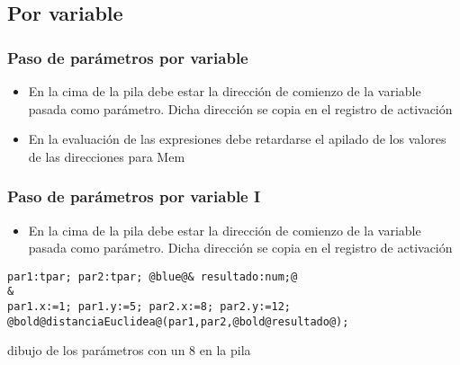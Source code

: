 \documentclass[hyperref={pdfpagelabels=false},tree-dvips,compress]{beamer}
\begin{document}
\subsection{Por variable}
\begin{frame}[fragile]
\frametitle{Paso de parámetros por variable}

\begin{itemize}[<+->]
	\item En la cima de la pila debe estar la dirección de comienzo de la variable pasada como parámetro. Dicha dirección se copia en el registro de activación
	\item En la evaluación de las expresiones debe retardarse el apilado de los valores de las direcciones para Mem
\end{itemize}


\end{frame}
\begin{frame}[fragile]
\frametitle{Paso de parámetros por variable I}

\begin{itemize}
	\item En la cima de la pila debe estar la dirección de comienzo de la variable pasada como parámetro. Dicha dirección se copia en el registro de activación
\end{itemize}

\begin{lstlisting}[style=codigo,basicstyle=\footnotesize\ttfamily]
par1:tpar; par2:tpar; @blue@& resultado:num;@
&
par1.x:=1; par1.y:=5; par2.x:=8; par2.y:=12;
@bold@distanciaEuclidea@(par1,par2,@bold@resultado@);
\end{lstlisting}

dibujo de los parámetros con un 8 en la pila

\end{frame}
\end{document}
